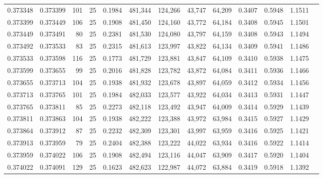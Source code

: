 \begin{tabular}{rrrrrrrrrrrrr}
0.373348 & 0.373399 &   101 &  25 &                                     0.1984 & 481,344 & 124,266 &  43,747 &  64,209 & 0.3407 & 0.5948 & 1.1511 \\
0.373399 & 0.373449 &   106 &  25 &                                     0.1908 & 481,450 & 124,160 &  43,772 &  64,184 & 0.3408 & 0.5945 & 1.1501 \\
0.373449 & 0.373491 &    80 &  25 &                                     0.2381 & 481,530 & 124,080 &  43,797 &  64,159 & 0.3408 & 0.5943 & 1.1494 \\
0.373492 & 0.373533 &    83 &  25 &                                     0.2315 & 481,613 & 123,997 &  43,822 &  64,134 & 0.3409 & 0.5941 & 1.1486 \\
0.373533 & 0.373598 &   116 &  25 &                                     0.1773 & 481,729 & 123,881 &  43,847 &  64,109 & 0.3410 & 0.5938 & 1.1475 \\
0.373599 & 0.373655 &    99 &  25 &                                     0.2016 & 481,828 & 123,782 &  43,872 &  64,084 & 0.3411 & 0.5936 & 1.1466 \\
0.373655 & 0.373713 &   104 &  25 &                                     0.1938 & 481,932 & 123,678 &  43,897 &  64,059 & 0.3412 & 0.5934 & 1.1456 \\
0.373713 & 0.373765 &   101 &  25 &                                     0.1984 & 482,033 & 123,577 &  43,922 &  64,034 & 0.3413 & 0.5931 & 1.1447 \\
0.373765 & 0.373811 &    85 &  25 &                                     0.2273 & 482,118 & 123,492 &  43,947 &  64,009 & 0.3414 & 0.5929 & 1.1439 \\
0.373811 & 0.373863 &   104 &  25 &                                     0.1938 & 482,222 & 123,388 &  43,972 &  63,984 & 0.3415 & 0.5927 & 1.1429 \\
0.373864 & 0.373912 &    87 &  25 &                                     0.2232 & 482,309 & 123,301 &  43,997 &  63,959 & 0.3416 & 0.5925 & 1.1421 \\
0.373913 & 0.373959 &    79 &  25 &                                     0.2404 & 482,388 & 123,222 &  44,022 &  63,934 & 0.3416 & 0.5922 & 1.1414 \\
0.373959 & 0.374022 &   106 &  25 &                                     0.1908 & 482,494 & 123,116 &  44,047 &  63,909 & 0.3417 & 0.5920 & 1.1404 \\
0.374022 & 0.374091 &   129 &  25 &                                     0.1623 & 482,623 & 122,987 &  44,072 &  63,884 & 0.3419 & 0.5918 & 1.1392 \\

\end{tabular}
